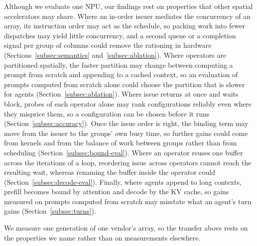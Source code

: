 \documentclass{article}
\begin{document}
Although we evaluate one NPU, our findings rest on properties that other spatial accelerators may share.
Where an in-order issuer mediates the concurrency of an array, its instruction order may act as the schedule, so packing work into fewer dispatches may yield little concurrency, and a second queue or a completion signal per group of columns could remove the rationing in hardware (Sections~\ref{subsec:semantics} and~\ref{subsec:ablation}).
Where operators are partitioned spatially, the faster partition may change between computing a prompt from scratch and appending to a cached context, so an evaluation of prompts computed from scratch alone could choose the partition that is slower for agents (Section~\ref{subsec:ablation}).
Where issue returns at once and waits block, probes of each operator alone may rank configurations reliably even where they misprice them, so a configuration can be chosen before it runs (Section~\ref{subsec:accuracy}).
Once the issue order is right, the binding term may move from the issuer to the groups' own busy time, so further gains could come from kernels and from the balance of work between groups rather than from scheduling (Section~\ref{subsec:bound-eval}).
Where an operator reuses one buffer across the iterations of a loop, reordering issue across operators cannot reach the resulting wait, whereas renaming the buffer inside the operator could (Section~\ref{subsec:decode-eval}).
Finally, where agents append to long contexts, prefill becomes bound by attention and decode by the KV cache, so gains measured on prompts computed from scratch may misstate what an agent's turn gains (Section~\ref{subsec:turns}).

We measure one generation of one vendor's array, so the transfer above rests on the properties we name rather than on measurements elsewhere.
\end{document}
